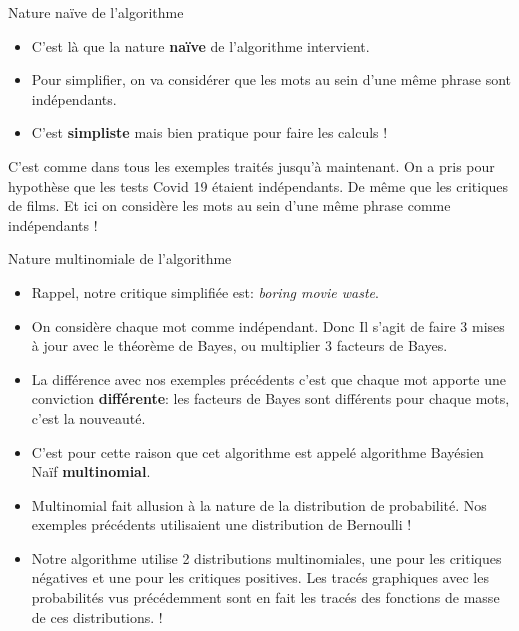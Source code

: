 \documentclass[10pt]{beamer}  %
\begin{document}
\begin{frame}{Nature naïve de l'algorithme}
	\begin{itemize}
		\item C'est là que la nature \textbf{naïve} de l'algorithme intervient.
		\pause
		\item Pour simplifier, on va considérer que les mots au sein d'une même phrase sont indépendants.
		\pause
		\item C'est \textbf{simpliste} mais bien pratique pour faire les calculs !
	\end{itemize}
	\pause
	\vspace{0.5cm}
	C'est comme dans tous les exemples traités jusqu'à maintenant. On a pris pour hypothèse que les tests Covid 19 étaient indépendants. De même que les critiques de films. Et ici on considère les mots au sein d'une même phrase comme indépendants !
\end{frame}

\begin{frame}{Nature multinomiale de l'algorithme}
	\begin{itemize}
		\item Rappel, notre critique simplifiée est: \textit{boring movie waste}.
		\pause
		\item On considère chaque mot comme indépendant. Donc Il s'agit de faire 3 mises à jour avec le théorème de Bayes, ou multiplier 3 facteurs de Bayes.
		\pause
		\item La différence avec nos exemples précédents c'est que chaque mot apporte une conviction \textbf{différente}: les facteurs de Bayes sont différents pour chaque mots, c'est la nouveauté.
		\pause
		\item C'est pour cette raison que cet algorithme est appelé algorithme Bayésien Naïf \textbf{multinomial}. 
		\pause
		\item Multinomial fait allusion à la nature de la distribution de probabilité. Nos exemples précédents utilisaient une distribution de Bernoulli !
		\pause
		\item Notre algorithme utilise 2 distributions multinomiales, une pour les critiques négatives et une pour les critiques positives. Les tracés graphiques avec les probabilités vus précédemment sont en fait les tracés des fonctions de masse de ces distributions. !
	\end{itemize}
\end{frame}
\end{document}
